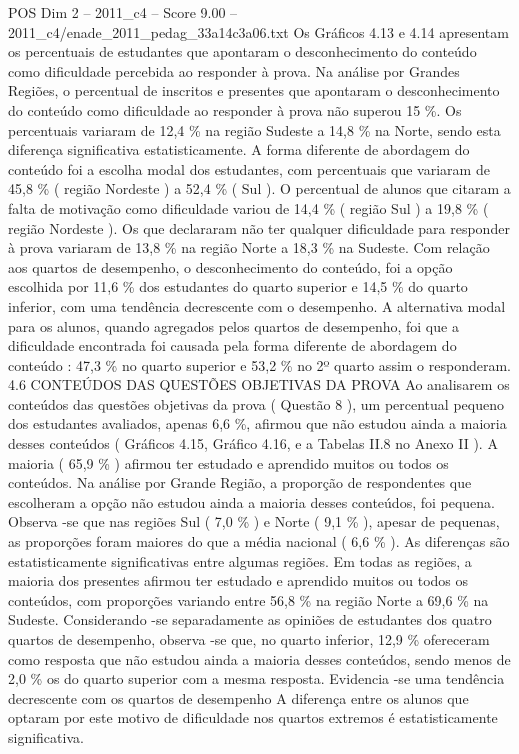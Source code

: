 \begin{textsample}{POS Dim 2 – 2011\_c4 – Score 9.00 – 2011\_c4/enade\_2011\_pedag\_33a14c3a06.txt}
Os Gráficos 4.13 e 4.14 apresentam os percentuais de estudantes que apontaram o desconhecimento do conteúdo como dificuldade percebida ao responder à prova.
Na análise por Grandes Regiões, o percentual de inscritos e presentes que apontaram o desconhecimento do conteúdo como dificuldade ao responder à prova não superou 15 \%.
Os percentuais variaram de 12,4 \% na região Sudeste a 14,8 \% na Norte, sendo esta diferença significativa estatisticamente.
A forma diferente de abordagem do conteúdo foi a escolha modal dos estudantes, com percentuais que variaram de 45,8 \% ( região Nordeste ) a 52,4 \% ( Sul ).
O percentual de alunos que citaram a falta de motivação como dificuldade variou de 14,4 \% ( região Sul ) a 19,8 \% ( região Nordeste ).
Os que declararam não ter qualquer dificuldade para responder à prova variaram de 13,8 \% na região Norte a 18,3 \% na Sudeste.
Com relação aos quartos de desempenho, o desconhecimento do conteúdo, foi a opção escolhida por 11,6 \% dos estudantes do quarto superior e 14,5 \% do quarto inferior, com uma tendência decrescente com o desempenho.
A alternativa modal para os alunos, quando agregados pelos quartos de desempenho, foi que a dificuldade encontrada foi causada pela forma diferente de abordagem do conteúdo : 47,3 \% no quarto superior e 53,2 \% no 2º quarto assim o responderam. 4.6 CONTEÚDOS DAS QUESTÕES OBJETIVAS DA PROVA Ao analisarem os conteúdos das questões objetivas da prova ( Questão 8 ), um percentual pequeno dos estudantes avaliados, apenas 6,6 \%, afirmou que não estudou ainda a maioria desses conteúdos ( Gráficos 4.15, Gráfico 4.16, e a Tabelas II.8 no Anexo II ).
A maioria ( 65,9 \% ) afirmou ter estudado e aprendido muitos ou todos os conteúdos.
Na análise por Grande Região, a proporção de respondentes que escolheram a opção não estudou ainda a maioria desses conteúdos, foi pequena.
Observa -se que nas regiões Sul ( 7,0 \% ) e Norte ( 9,1 \% ), apesar de pequenas, as proporções foram maiores do que a média nacional ( 6,6 \% ).
As diferenças são estatisticamente significativas entre algumas regiões.
Em todas as regiões, a maioria dos presentes afirmou ter estudado e aprendido muitos ou todos os conteúdos, com proporções variando entre 56,8 \% na região Norte a 69,6 \% na Sudeste.
Considerando -se separadamente as opiniões de estudantes dos quatro quartos de desempenho, observa -se que, no quarto inferior, 12,9 \% ofereceram como resposta que não estudou ainda a maioria desses conteúdos, sendo menos de 2,0 \% os do quarto superior com a mesma resposta.
Evidencia -se uma tendência decrescente com os quartos de desempenho A diferença entre os alunos que optaram por este motivo de dificuldade nos quartos extremos é estatisticamente significativa.

\end{textsample}
